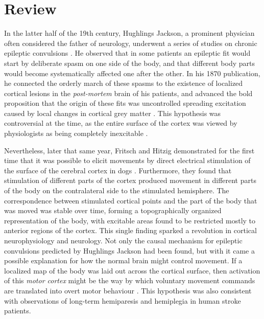 \section{Review}

In the latter half of the 19th century, Hughlings Jackson, a prominent physician often considered the father of neurology, underwent a series of studies on chronic epileptic convulsions \cite{Jackson1870}. He observed that in some patients an epileptic fit would start by deliberate spasm on one side of the body, and that different body parts would become systematically affected one after the other. In his 1870 publication, he connected the orderly march of these spasms to the existence of localized cortical lesions in the \emph{post-mortem} brain of his patients, and advanced the bold proposition that the origin of these fits was uncontrolled spreading excitation caused by local changes in cortical grey matter \cite{Jackson1870}. This hypothesis was controversial at the time, as the entire surface of the cortex was viewed by physiologists as being completely inexcitable \cite{Gross2007}.

Nevertheless, later that same year, Fritsch and Hitzig demonstrated for the first time that it was possible to elicit movements by direct electrical stimulation of the surface of the cerebral cortex in dogs \cite{Fritsch1870}. Furthermore, they found that stimulation of different parts of the cortex produced movement in different parts of the body on the contralateral side to the stimulated hemisphere. The correspondence between stimulated cortical points and the part of the body that was moved was stable over time, forming a topographically organized representation of the body, with excitable areas found to be restricted mostly to anterior regions of the cortex. This single finding sparked a revolution in cortical neurophysiology and neurology. Not only the causal mechanism for epileptic convulsions predicted by Hughlings Jackson had been found, but with it came a possible explanation for how the normal brain might control movement. If a localized map of the body was laid out across the cortical surface, then activation of this \emph{motor cortex} might be the way by which voluntary movement commands are translated into overt motor behaviour \cite{Fritsch1870}. This hypothesis was also consistent with observations of long-term hemiparesis and hemiplegia in human stroke patients.


